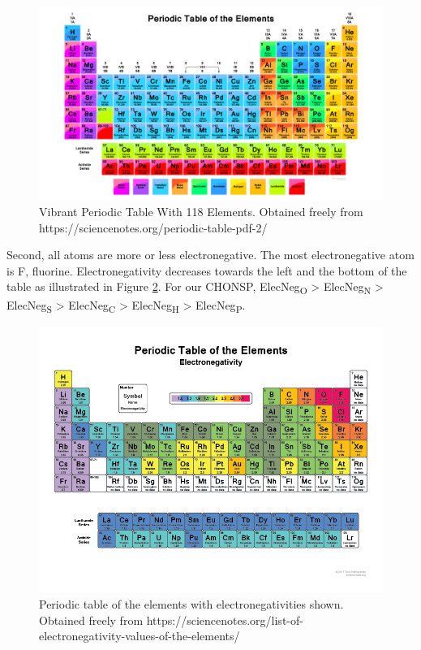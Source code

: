 \documentclass[]{book}
\theoremstyle{definition}
\theoremstyle{definition}
\theoremstyle{definition}
\theoremstyle{remark}
\begin{document}
\begin{figure}

{\centering \includegraphics[width=1\linewidth]{pictures/periodictable} 

}

\caption{Vibrant Periodic Table With 118 Elements. Obtained freely from https://sciencenotes.org/periodic-table-pdf-2/ }\label{fig:periodic-table}
\end{figure}

Second, all atoms are more or less electronegative. The most
electronegative atom is F, fluorine. Electronegativity decreases towards
the left and the bottom of the table as illustrated in Figure
\ref{fig:periodic-table-electroneg}. For our CHONSP,
ElecNeg\textsubscript{O} \textgreater{} ElecNeg\textsubscript{N}
\textgreater{} ElecNeg\textsubscript{S} \textgreater{}
ElecNeg\textsubscript{C} \textgreater{} ElecNeg\textsubscript{H}
\textgreater{} ElecNeg\textsubscript{P}.

\begin{figure}

{\centering \includegraphics[width=1\linewidth]{pictures/PeriodicTableElectronegativity} 

}

\caption{Periodic table of the elements with electronegativities shown. Obtained freely from https://sciencenotes.org/list-of-electronegativity-values-of-the-elements/ }\label{fig:periodic-table-electroneg}
\end{figure}
\end{document}
